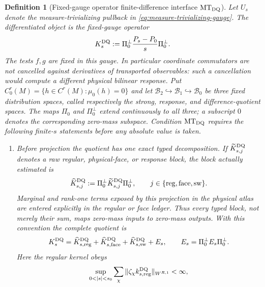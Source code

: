 \documentclass[11pt]{article}
\newtheorem{definition}[theorem]{Definition}
\newcommand{\cB}{\mathcal B}
\begin{document}
\begin{definition}[Fixed-gauge operator finite-difference interface
$\mathrm{MT}_{\rm DQ}$]
\label{def:measure-gauge-interface}
Let $U_s$ denote the measure-trivializing pullback in
\eqref{eq:measure-trivializing-gauge}.  The differentiated object is the
fixed-gauge operator
\begin{equation}
\label{eq:fixed-gauge-operator-DQ}
 K_s^{\rm DQ}:=\Pi_0^\perp\frac{P_s-P_0}{s}\Pi_0^\perp .
\end{equation}
The tests $f,g$ are fixed in this gauge.  In particular coordinate
commutators are not cancelled against derivatives of transported
observables: such a cancellation would compute a different physical
bilinear response.  Put
$C^r_0(M)=\{h\in C^r(M):\mu_0(h)=0\}$ and let
$\cB_2\hookrightarrow\cB_1\hookrightarrow\cB_0$ be three fixed distribution
spaces, called respectively the strong, response, and difference-quotient
spaces.  The maps $\Pi_0$ and $\Pi_0^\perp$ extend continuously to all three;
a subscript $0$ denotes the corresponding zero-mass subspace.  Condition
$\mathrm{MT}_{\rm DQ}$ requires the following finite-$s$ statements before
any absolute value is taken.
\begin{enumerate}[label=\textup{(MT\arabic*)}]
\item Before projection the quotient has one exact typed decomposition.  If
      $\widetilde K_{s,j}^{\rm DQ}$ denotes a raw regular, physical-face, or
      response block, the block actually estimated is
      \begin{equation}
      \label{eq:typed-block-double-projection}
       \widehat K_{s,j}^{\rm DQ}
       :=\Pi_0^\perp\widetilde K_{s,j}^{\rm DQ}\Pi_0^\perp,
       \qquad j\in\{\mathrm{reg},\mathrm{face},\mathrm{sw}\}.
      \end{equation}
      Marginal and rank-one terms exposed by this projection in the physical
      atlas are entered explicitly in the regular or face ledger.  Thus every
      typed block, not merely their sum, maps zero-mass inputs to zero-mass
      outputs.  With this convention the complete quotient is
      \[
        K_s^{\rm DQ}=\widehat K_{s,\rm reg}^{\rm DQ}
          +\widehat K_{s,\rm face}^{\rm DQ}
          +\widehat K_{s,\rm sw}^{\rm DQ}+E_s,
        \qquad E_s=\Pi_0^\perp E_s\Pi_0^\perp .
      \]
      Here the regular kernel obeys
      \begin{equation}
      \label{eq:uniform-gauge-DQ-regular}
       \sup_{0<|s|<s_0}\sum_\chi
       \|\zeta_\chi k_{s,\rm reg}^{\rm DQ}\|_{W^{R,1}}<\infty ,
      \end{equation}

\end{enumerate}
\end{definition}
\end{document}
